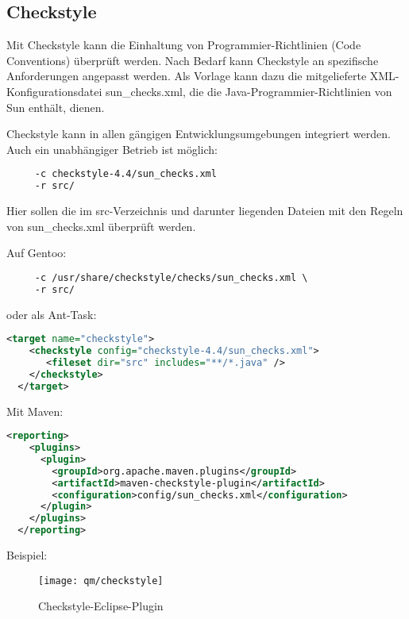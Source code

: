\subsection{Checkstyle}
Mit Checkstyle kann die Einhaltung von Programmier-Richtlinien (Code
Conventions) überprüft werden. Nach Bedarf kann Checkstyle an spezifische
Anforderungen angepasst werden. Als Vorlage kann dazu die mitgelieferte
XML-Konfigurationsdatei sun\_checks.xml, die die Java-Programmier-Richtlinien
von Sun enthält, dienen.

\ifslides
\newpage
\fi
Checkstyle kann in allen gängigen Entwicklungsumgebungen integriert
 werden. Auch ein unabhängiger Betrieb ist möglich:
 \begin{lstlisting}[language=csh]
% java -jar checkstyle-all-4.4.jar \
     -c checkstyle-4.4/sun_checks.xml
     -r src/
 \end{lstlisting}
Hier sollen die im src-Verzeichnis und darunter liegenden Dateien mit den
 Regeln von sun\_checks.xml überprüft werden.

Auf Gentoo:
 \begin{lstlisting}[language=csh]
% checkstyle \
     -c /usr/share/checkstyle/checks/sun_checks.xml \
     -r src/
 \end{lstlisting}
\newslide
oder als Ant-Task:
\begin{lstlisting}[language=xml]
  <target name="checkstyle">
    <checkstyle config="checkstyle-4.4/sun_checks.xml">
       <fileset dir="src" includes="**/*.java" />
    </checkstyle>
  </target>
\end{lstlisting}
\newslide
Mit Maven:
\begin{lstlisting}[language=xml,
  morekeywords={reporting,plugins,plugin,groupId,artifactId,configuration}]
  <reporting>
    <plugins>
      <plugin>
        <groupId>org.apache.maven.plugins</groupId>
        <artifactId>maven-checkstyle-plugin</artifactId>
        <configuration>config/sun_checks.xml</configuration>
      </plugin>
    </plugins>
  </reporting>
\end{lstlisting}
\newpage
Beispiel:
\begin{figure}[H]
\texttt{[image: qm/checkstyle]}
\caption{Checkstyle-Eclipse-Plugin}
\end{figure}
%
\newslide

